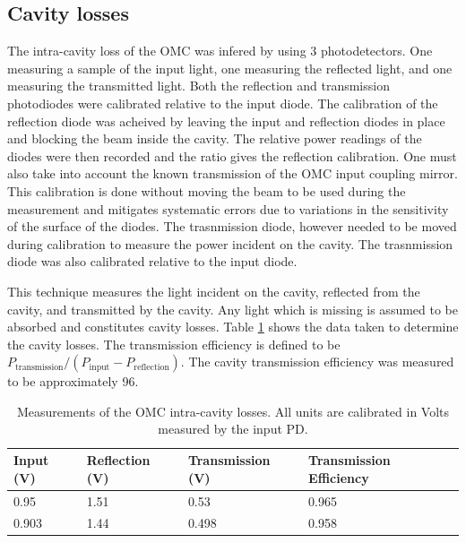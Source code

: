 \subsection{Cavity losses}
The intra-cavity loss of the OMC was infered by using 3 photodetectors. %
One measuring a sample of the input light, one measuring the reflected light, and one measuring the transmitted light. %
Both the reflection and transmission photodiodes were calibrated relative to the input diode. %
The calibration of the reflection diode was acheived by leaving the input and reflection diodes in place and blocking the beam inside the cavity. %
The relative power readings of the diodes were then recorded and the ratio gives the reflection calibration. %
One must also take into account the known transmission of the OMC input coupling mirror. %
This calibration is done without moving the beam to be used during the measurement and mitigates systematic errors due to variations in the sensitivity of the surface of the diodes. %
The trasnmission diode, however needed to be moved during calibration to measure the power incident on the cavity. %
The trasnmission diode was also calibrated relative to the input diode.

This technique measures the light incident on the cavity, reflected from the cavity, and transmitted by the cavity. %
Any light which is missing is assumed to be absorbed and constitutes cavity losses. %
Table \ref{tab:lossmeas} shows the data taken to determine the cavity losses. %
The transmission efficiency is defined to be $P_{\text{transmission}}/(P_{\text{input}}-P_{\text{reflection}})$. %
The cavity transmission efficiency was measured to be approximately 96\perc{}.

\begin{table}
  \begin{center}
    \begin{tabular}{lll|l}
      \hline
      Input (V) & Reflection (V) & Transmission (V) & Transmission Efficiency \\
      \hline
      0.95 & 1.51 & 0.53 & 0.965 \\
      0.903 & 1.44 &0.498 & 0.958\\
      \hline
    \end{tabular}
  \caption[Measurements of the OMC intra-cavity losses.]{Measurements of the OMC intra-cavity losses. All units are calibrated in Volts measured by the input PD.}
  \label{tab:lossmeas}
  \end{center}
\end{table}

